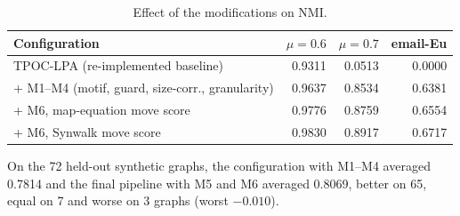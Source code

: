 \documentclass[conference]{IEEEtran}
\begin{document}
\begin{table}[H]
\centering
\caption{Effect of the modifications on NMI.}
\label{tab:abl}
\scriptsize
\begin{tabular}{>{\raggedright\arraybackslash}p{38mm}rrr}
\toprule
Configuration & $\mu{=}0.6$ & $\mu{=}0.7$ & email-Eu \\
\midrule
TPOC-LPA (re-implemented baseline) & 0.9311 & 0.0513 & 0.0000 \\
+ M1--M4 (motif, guard, size-corr., granularity) & 0.9637 & 0.8534 & 0.6381 \\
+ M6, map-equation move score & 0.9776 & 0.8759 & 0.6554 \\
+ M6, Synwalk move score & 0.9830 & 0.8917 & 0.6717 \\
\bottomrule
\end{tabular}
\end{table}
On the 72 held-out synthetic graphs, the configuration with M1--M4 averaged 0.7814 and the final pipeline with M5 and M6 averaged 0.8069, better on 65, equal on 7 and worse on 3 graphs (worst $-0.010$).
\end{document}
